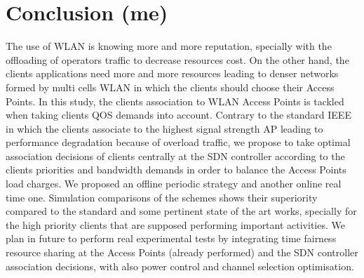 \documentclass[journal,transmag]{IEEEtran}
\begin{document}
\section{Conclusion (me)}
\label{Conclusion}
The use of WLAN is knowing more and more reputation, specially with the offloading of operators traffic to decrease resources cost. On the other hand, the clients applications need more and more resources leading to denser networks formed by multi cells WLAN in which the clients should choose their Access Points.
In this study, the clients association to WLAN Access Points is tackled when taking clients QOS demands into account. Contrary to the standard IEEE in which the clients associate to the highest signal strength AP leading to performance degradation because of overload traffic, we propose to take optimal association decisions of clients centrally at the SDN controller according to the clients priorities and bandwidth demands in order to balance the Access Points load charges. We proposed an offline periodic strategy and another online real time one. Simulation comparisons of the schemes shows their superiority compared to the standard and some pertinent state of the art works, specially for the high priority clients that are supposed performing important activities. We plan in future to perform real experimental tests by integrating time fairness resource sharing at the Access Points (already performed) and the SDN controller association decisions, with also power control and channel selection optimisation. 



\end{document}
